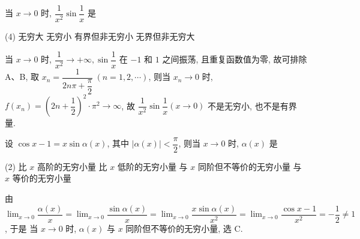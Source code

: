 \begin{example}
    当 $x\to0$ 时, $\dfrac{1}{x^2}\sin\dfrac{1}{x}$ 是
    \begin{tasks}(4)
        \task 无穷大
        \task 无穷小
        \task 有界但非无穷小
        \task 无界但非无穷大
    \end{tasks}
\end{example}
\begin{solution}
    当 $ x \to 0 $ 时, $ \dfrac{1}{x^{2}} \to+\infty, \sin \dfrac{1}{x} $ 在 $-1$ 和 $1$ 之间振荡, 且重复函数值为零, 故可排除 A、B, 取 $ x_{n}=\dfrac{1}{2 n \pi+\dfrac{\pi}{2}}~(n=1,2, \cdots) $, 则当 $ x_{n} \to 0 $ 时, $ f\left(x_{n}\right)=\left(2 n+\dfrac{1}{2}\right)^{2} \cdot \pi^{2} \to \infty $, 故 $ \dfrac{1}{x^{2}} \sin \dfrac{1}{x}(x \to 0) $ 不是无穷小, 也不是有界量.
\end{solution}

\begin{example}
    设 $\cos x-1=x\sin\alpha(x)$, 其中 $|\alpha(x)|<\dfrac{\pi}{2}$, 则当 $x\to0$ 时, $\alpha(x)$ 是
    \begin{tasks}(2)
        \task 比 $x$ 高阶的无穷小量
        \task 比 $x$ 低阶的无穷小量
        \task 与 $x$ 同阶但不等价的无穷小量
        \task 与 $x$ 等价的无穷小量
    \end{tasks}
\end{example}
\begin{solution}
    由 $\displaystyle \lim_{x\to0}\dfrac{\alpha(x)}{x}=\lim_{x\to0}\dfrac{\sin\alpha(x)}{x}=\lim_{x\to0}\dfrac{x\sin\alpha(x)}{x^2}=\lim_{x\to0}\dfrac{\cos x-1}{x^2}=-\dfrac{1}{2}\neq1$, 于是
    当 $x\to0$ 时, $\alpha(x)$ 与 $x$ 同阶但不等价的无穷小量, 选 C.
\end{solution}

